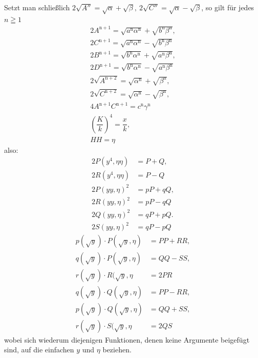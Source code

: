 Setzt man schließlich $2\surd {A''}=\surd \alpha+\surd \beta,\allowbreak \ 2\surd {C''}=\surd \alpha-\surd \beta$, so gilt für jedes $n\geqq1$
\[
\begin{gathered}
2A^{\mathrm n+1}=\surd {a^{\mathrm n}\alpha^{\mathrm n}}+\surd {b^{\mathrm n}\beta^{\mathrm n}},\\[7pt]
2C^{\mathrm n+1}=\surd {a^{\mathrm n}\alpha^{\mathrm n}}-\surd {b^{\mathrm n}\beta^{\mathrm n}}\\[7pt]
2B^{\mathrm n+1}=\surd {b^{\mathrm n}\alpha^{\mathrm n}}+\surd {a^{\mathrm n}\beta^{\mathrm n}},\\[7pt]
2D^{\mathrm n+1}=\surd {b^{\mathrm n}\alpha^{\mathrm n}}-\surd {a^{\mathrm n}\beta^{\mathrm n}}\\[7pt]
2\surd {A^{\mathrm n+2}}=\surd {\alpha^{\mathrm n}}+\surd {\beta^{\mathrm n}},\\[7pt]
2\surd {C^{\mathrm n+2}}=\surd {\alpha^{\mathrm n}}-\surd {\beta^{\mathrm n}},\\[7pt]
4A^{\mathrm n+1}C^{\mathrm n+1}=c^{\mathrm n}\gamma^{\mathrm n}\\[7pt]
\left(\dfrac Kk\right)^4=\dfrac{x}k,\\[7pt] HH=\eta
\end{gathered}
\]
also:
\[
\begin{aligned}
2P(y^4,\eta\eta)&=P+Q,\\[6pt]2R(y^4,\eta\eta)&=P-Q\\[6pt]
2P(yy,\eta)^2&=pP+qQ,\\[6pt]2R(yy,\eta)^2&=pP-qQ\\[6pt]
2Q(yy,\eta)^2&=qP+pQ.\\[6pt]2S(yy,\eta)^2&=qP-pQ
\end{aligned}
\]
\[
\begin{aligned}
p(\surd  y)\cdot P(\surd  y,\eta)&=PP+RR,\\[6pt]
q(\surd  y)\cdot P(\surd  y,\eta)&=QQ-SS,\\[6pt]
r(\surd  y)\cdot R(\surd  y,\eta&=2PR\\[6pt]
q(\surd  y)\cdot Q(\surd  y,\eta)&=PP-RR,\\[6pt]
p(\surd  y)\cdot Q(\surd  y,\eta)&=QQ+SS,\\[6pt]
r(\surd  y)\cdot S(\surd  y,\eta&=2QS
\end{aligned}
\]
wobei sich wiederum diejenigen Funktionen, denen keine Argumente beigefügt sind, auf die einfachen $y$ und $\eta$ beziehen.

